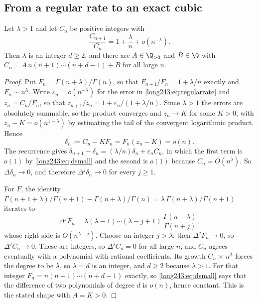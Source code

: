 \subsection{From a regular rate to an exact cubic}

\begin{lemma}\label{long243:res:extraction}
Let $\lambda>1$ and let $C_n$ be positive integers with
\begin{equation}\label{long243:eq:regularrate}
 \frac{C_{n+1}}{C_n}=1+\frac\lambda n+o(n^{-\lambda}).
\end{equation}
Then $\lambda$ is an integer $d\ge2$, and there are $A\in\Q_{>0}$ and
$B\in\Q$ with $C_n=A\,n(n+1)\cdots(n+d-1)+B$ for all large $n$.
\end{lemma}

\begin{proof}
Put $F_n=\Gamma(n+\lambda)/\Gamma(n)$, so that $F_{n+1}/F_n=1+\lambda/n$
exactly and $F_n\sim n^\lambda$.  Write $\varepsilon_n=o(n^{-\lambda})$ for the
error in \eqref{long243:eq:regularrate} and $z_n=C_n/F_n$, so that
$z_{n+1}/z_n=1+\varepsilon_n/(1+\lambda/n)$.  Since $\lambda>1$ the errors are
absolutely summable, so the product converges and $z_n\to K$ for some $K>0$,
with $z_n-K=o(n^{1-\lambda})$ by estimating the tail of the convergent
logarithmic product.  Hence
\begin{equation}\label{long243:eq:dsmall}
 \delta_n:=C_n-KF_n=F_n(z_n-K)=o(n).
\end{equation}
The recurrence gives
$\delta_{n+1}-\delta_n=(\lambda/n)\delta_n+\varepsilon_nC_n$, in which the
first term is $o(1)$ by \eqref{long243:eq:dsmall} and the second is $o(1)$ because
$C_n=O(n^\lambda)$.  So $\Delta\delta_n\to0$, and therefore
$\Delta^j\delta_n\to0$ for every $j\ge1$.

For $F$, the identity $\Gamma(n+1+\lambda)/\Gamma(n+1)-\Gamma(n+\lambda)/\Gamma(n)
=\lambda\,\Gamma(n+\lambda)/\Gamma(n+1)$ iterates to
\[
 \Delta^jF_n=\lambda(\lambda-1)\cdots(\lambda-j+1)\,
 \frac{\Gamma(n+\lambda)}{\Gamma(n+j)},
\]
whose right side is $O(n^{\lambda-j})$.  Choose an integer $j>\lambda$; then
$\Delta^jF_n\to0$, so $\Delta^jC_n\to0$.  These are integers, so
$\Delta^jC_n=0$ for all large $n$, and $C_n$ agrees eventually with a
polynomial with rational coefficients.  Its growth $C_n\asymp n^\lambda$ forces
the degree to be $\lambda$, so $\lambda=d$ is an integer, and $d\ge2$ because
$\lambda>1$.  For that integer $F_n=n(n+1)\cdots(n+d-1)$ exactly, so
\eqref{long243:eq:dsmall} says that the difference of two polynomials of degree $d$ is
$o(n)$, hence constant.  This is the stated shape with $A=K>0$.
\end{proof}

